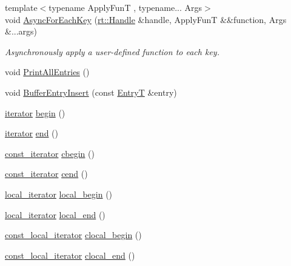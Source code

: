 \begin{DoxyCompactItemize}
{\footnotesize template$<$typename Apply\-Fun\-T , typename... Args$>$ }\\void \hyperlink{classshad_1_1Hashmap_acd1166f6dd5ad1f9f3748ea45b596860}{Async\-For\-Each\-Key} (\hyperlink{classshad_1_1rt_1_1Handle}{rt\-::\-Handle} \&handle, Apply\-Fun\-T \&\&function, Args \&...args)
\begin{DoxyCompactList}\small\item\em Asynchronously apply a user-\/defined function to each key. \end{DoxyCompactList}\item 
void \hyperlink{classshad_1_1Hashmap_aee2b37787d771a453bfe49a85e352e3e}{Print\-All\-Entries} ()
\item 
void \hyperlink{classshad_1_1Hashmap_a313c1401e0dd0cc51cfc750a740f3772}{Buffer\-Entry\-Insert} (const \hyperlink{structshad_1_1Hashmap_1_1EntryT}{Entry\-T} \&entry)
\item 
\hyperlink{classshad_1_1Hashmap_a4603e48d3ad3a380abc888671e55bf01}{iterator} \hyperlink{classshad_1_1Hashmap_a8f4a24ff42fd6f6c3394a352169bccb9}{begin} ()
\item 
\hyperlink{classshad_1_1Hashmap_a4603e48d3ad3a380abc888671e55bf01}{iterator} \hyperlink{classshad_1_1Hashmap_a72709bee83695661dbd0a43699cd1833}{end} ()
\item 
\hyperlink{classshad_1_1Hashmap_a1f8a379c42bc2d4b67dcc9f519dc537e}{const\-\_\-iterator} \hyperlink{classshad_1_1Hashmap_aa014bed8d66b4adb7274687b9074cc53}{cbegin} ()
\item 
\hyperlink{classshad_1_1Hashmap_a1f8a379c42bc2d4b67dcc9f519dc537e}{const\-\_\-iterator} \hyperlink{classshad_1_1Hashmap_a75006495ce7c58a32c5724cae27944ed}{cend} ()
\item 
\hyperlink{classshad_1_1Hashmap_abf95d16be9ba9060bff9fa591ece302f}{local\-\_\-iterator} \hyperlink{classshad_1_1Hashmap_a4706991a9277cc89fcd154bf73025183}{local\-\_\-begin} ()
\item 
\hyperlink{classshad_1_1Hashmap_abf95d16be9ba9060bff9fa591ece302f}{local\-\_\-iterator} \hyperlink{classshad_1_1Hashmap_a6fff153fc13d2d3c3337ac0dfa594b28}{local\-\_\-end} ()
\item 
\hyperlink{classshad_1_1Hashmap_afdf2dad495223a7d8bcec4256b591d89}{const\-\_\-local\-\_\-iterator} \hyperlink{classshad_1_1Hashmap_a04a14f79c423b6bef9fba77f642be9b6}{clocal\-\_\-begin} ()
\item 
\hyperlink{classshad_1_1Hashmap_afdf2dad495223a7d8bcec4256b591d89}{const\-\_\-local\-\_\-iterator} \hyperlink{classshad_1_1Hashmap_a41013ec16375b3de1af140c8f2e54627}{clocal\-\_\-end} ()
\end{DoxyCompactItemize}
